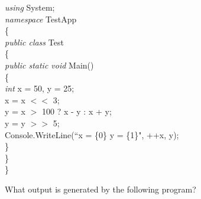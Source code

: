 {\begin{list}{E \thechapter.\theenumi}
\emph{using} System;\\
\emph{namespace} TestApp\\
\{\\
\hspace*{0.2in}    \emph{public class} Test\\
\hspace*{0.2in} \{\\
\hspace*{0.4in}        \emph{public static void} Main()\\
\hspace*{0.4in}        \{\\
\hspace*{0.6in}            \emph{int} x = 50, y = 25;\\
\hspace*{0.6in}            x = x $<\!<$ 3;\\
\hspace*{0.6in}            y = x $>$ 100 ? x - y : x + y;\\
\hspace*{0.6in}            y = y $>\!>$ 5;\\
\hspace*{0.6in}            Console.WriteLine(``x = \{0\}  y = \{1\}", ++x, y);\\
\hspace*{0.4in}        \}\\
\hspace*{0.2in}    \}\\
\}



\item What output is generated by the following program?


\end{list}}
